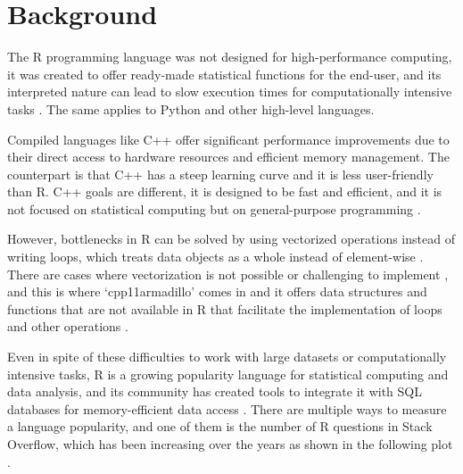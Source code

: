 \documentclass[
  10pt,
  letterpaper,
]{article}
\begin{document}
\section{Background}\label{background}

The R programming language was not designed for high-performance
computing, it was created to offer ready-made statistical functions for
the end-user, and its interpreted nature can lead to slow execution
times for computationally intensive tasks \citep{wickham2019, r2024}.
The same applies to Python and other high-level languages.

Compiled languages like C++ offer significant performance improvements
due to their direct access to hardware resources and efficient memory
management. The counterpart is that C++ has a steep learning curve and
it is less user-friendly than R. C++ goals are different, it is designed
to be fast and efficient, and it is not focused on statistical computing
but on general-purpose programming \citep{stroustrup2012}.

However, bottlenecks in R can be solved by using vectorized operations
instead of writing loops, which treats data objects as a whole instead
of element-wise \citep{burns2011}. There are cases where vectorization
is not possible or challenging to implement \citep{burns2011}, and this
is where `cpp11armadillo' comes in and it offers data structures and
functions that are not available in R that facilitate the implementation
of loops and other operations \citep{r2024, sanderson2016}.

Even in spite of these difficulties to work with large datasets or
computationally intensive tasks, R is a growing popularity language for
statistical computing and data analysis, and its community has created
tools to integrate it with SQL databases for memory-efficient data
access \citep{rpostgres}. There are multiple ways to measure a language
popularity, and one of them is the number of R questions in Stack
Overflow, which has been increasing over the years as shown in the
following plot \citep{stackoverflow2024}.
\end{document}
